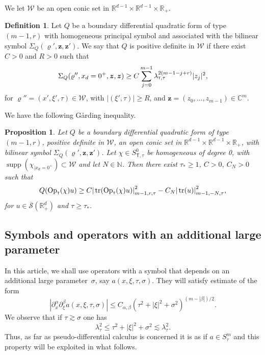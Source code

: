 \documentclass[JEP,XML,SOM,Unicode,published]{cedram}
\theoremstyle{plain}
\newtheorem{proposition}[theorem]{Proposition}
\theoremstyle{definition}
\newtheorem{definition}[theorem]{Definition}
\def\R{\mathbb{R}}
\def\C{\mathbb{C}}
\def\N{\mathbb{N}}
\let\Bquad Q
\let\y\varrho
\let \Re \relax
\DeclareMathOperator{\Re}{Re}
\newcommand{\un}[1]{\Sigma_{#1}}
\newcommand{\z}{\boldsymbol{z}}
\newcommand{\br}{\ensuremath{_{|x_d=0^+}}}
\newcommand{\Opt}{\ensuremath{\mathrm{Op}_{\scriptscriptstyle{\mathsf{T}}}}}
\newcommand{\normsc}[2]{{| #1 |}_{#2, \tau}}
\newcommand{\lsc}{\lambda_\tau}
\newcommand{\lsct}{\lambda_{{\scriptscriptstyle{\mathsf T}},\tau}}
\newcommand{\Ssc}{S_\tau}
\newcommand{\Ssct}{S_{{\scriptscriptstyle{\mathsf T}},\tau}}
\newcommand{\Sbarp}{\ensuremath{\overline{\mathscr{S}}(\Rdp)}}
\newcommand{\Rdp}{\R^d_+}
\DeclareMathOperator{\supp}{supp}
\DeclareMathOperator{\trace}{tr}
\begin{document}
We let $\mathscr W$ be an open conic set in $\R^{d-1} \times \R^{d-1} \times \R_+$.

\skpt
\begin{definition}
Let $\Bquad$ be a boundary differential quadratic form of type \hbox{$(m-1,r)$} with
homogeneous principal symbol and
associated with the bilinear symbol $\un{\Bquad}(\y',\z,\z')$. We say that $\Bquad$ is
positive definite in $\mathscr W$ if there exist $C>0$ and $R>0$ such that
\begin{equation*}
\Re \un{\Bquad}(\y'', x_d = 0^+, \z,\z)\geq
C\sum_{j=0}^{m-1} \lsct^{2(m-1-j+r)}|z_j|^2,
\end{equation*}
for $\y''=(x',\xi',\tau) \in \mathscr W$, with $|(\xi', \tau)| \geq
R$, and
$\z=(z_0,\dots,z_{m-1})\in \C^m$.
\end{definition}

We have the following G{\aa}rding inequality.

\begin{proposition}
\label{prop: boundary form -Gaarding tangentiel}
Let $\Bquad$ be a boundary differential quadratic form of type $(m-1,r)$,
positive definite in $\mathscr W$, an open conic set in $\R^{d-1}
\times \R^{d-1} \times \R_+$, with bilinear symbol
$\un{\Bquad}(\y',\z,\z')$. Let $\chi \in \Ssct^0$ be homogeneous of
degree 0, with $\supp(\chi\br)\subset \mathscr W$ and let $N\in \N$. Then
there exist $\tau_\ast\geq 1$, $C>0$, $C_N >0$ such that
\begin{equation*}
\Re \Bquad(\Opt(\chi) u)
\geq C\normsc{\trace(\Opt(\chi) u)}{m-1,r}^2
-C_N\normsc{\trace(u)}{m-1,-N}^2,
\end{equation*}
for $u\in \Sbarp$ and $\tau\geq\tau_\ast$.
\end{proposition}

\subsection{Symbols and operators with an additional large parameter}
\label{sec: calculus with spectral parameter}
In this article, we shall use operators with a symbol that depends
on an additional large parameter~$\sigma$, say $a(x,\xi,\tau,\sigma)$. They
will satisfy estimate of the form\vspace*{-3pt}
\begin{equation*}
|\partial^{\alpha}_x\partial^{\beta}_{\xi}a(x,\xi,\tau,\sigma)|\leq
C_{\alpha,\beta}(\tau^2+|\xi|^2+\sigma^2)^{(m-|\beta|)/2}.
\end{equation*}
We observe that if $\tau\gtrsim \sigma$ one has\vspace*{-3pt}\enlargethispage{.5\baselineskip}
\begin{equation*}
\lsc^2 \leq \tau^2+|\xi|^2+\sigma^2 \lesssim \lsc^2.
\end{equation*}
Thus, as far as pseudo-differential calculus is concerned it is as if
$a\in \Ssc^m$ and this property will be
exploited in what follows.
\end{document}
